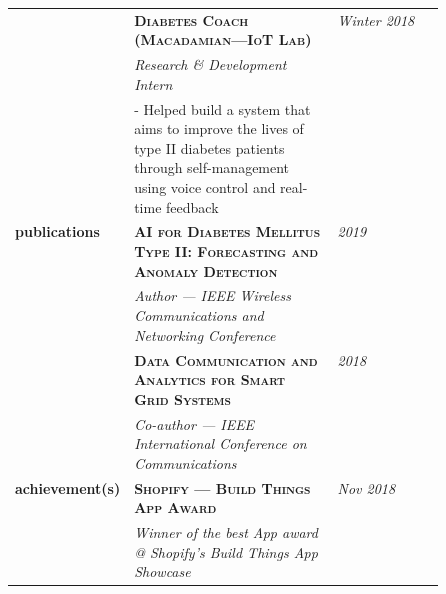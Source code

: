 \documentclass{article}
\begin{document}
\begin{longtable}{@{}>{\raggedleft}p{0.25\linewidth}
                          p{}>{}p{0.25\linewidth}@{}}
            & \textbf{\textsc{Diabetes Coach (Macadamian---IoT Lab)}} & \textit{Winter 2018} \\
            & \textit{Research \& Development Intern}\\
            & - Helped build a system that aims to improve the lives of type II diabetes patients through self-management using voice control and real-time feedback \\ [2em]

        \textbf{publications}
            & \textbf{\textsc{AI for Diabetes Mellitus Type II: Forecasting and Anomaly Detection}} & \textit{2019}\\
            & \textit{Author --- IEEE Wireless Communications and Networking Conference}  \\ [1em]

            & \textbf{\textsc{Data Communication and Analytics for Smart Grid Systems}} & \textit{2018}\\
            & \textit{Co-author --- IEEE International Conference on Communications}\\ [1em]

        \textbf{achievement(s)}
            & \textbf{\textsc{Shopify --- Build Things App Award}} & \textit{Nov 2018} \\
            & \textit{Winner of the best App award @ Shopify's Build Things App Showcase} \\ [1em]

  \end{longtable}
\end{document}
